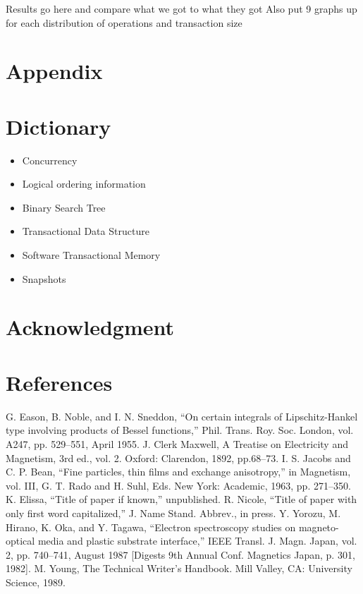 \documentclass[conference]{IEEEtran}
\begin{document}
Results go here and compare what we got to what they got
Also put 9 graphs up for each distribution of operations and transaction size

\section{Appendix}

\section{Dictionary}
\begin{itemize}[label=$\ast$]
	\item Concurrency
	\item Logical ordering information
	\item Binary Search Tree
	\item Transactional Data Structure
	\item Software Transactional Memory
	\item Snapshots
\end{itemize}

\section*{Acknowledgment}

\section*{References}




\begin{thebibliography}{00}
 G. Eason, B. Noble, and I. N. Sneddon, ``On certain integrals of Lipschitz-Hankel type involving products of Bessel functions,'' Phil. Trans. Roy. Soc. London, vol. A247, pp. 529--551, April 1955.
 J. Clerk Maxwell, A Treatise on Electricity and Magnetism, 3rd ed., vol. 2. Oxford: Clarendon, 1892, pp.68--73.
 I. S. Jacobs and C. P. Bean, ``Fine particles, thin films and exchange anisotropy,'' in Magnetism, vol. III, G. T. Rado and H. Suhl, Eds. New York: Academic, 1963, pp. 271--350.
 K. Elissa, ``Title of paper if known,'' unpublished.
 R. Nicole, ``Title of paper with only first word capitalized,'' J. Name Stand. Abbrev., in press.
 Y. Yorozu, M. Hirano, K. Oka, and Y. Tagawa, ``Electron spectroscopy studies on magneto-optical media and plastic substrate interface,'' IEEE Transl. J. Magn. Japan, vol. 2, pp. 740--741, August 1987 [Digests 9th Annual Conf. Magnetics Japan, p. 301, 1982].
 M. Young, The Technical Writer's Handbook. Mill Valley, CA: University Science, 1989.

\end{thebibliography}
\end{document}
